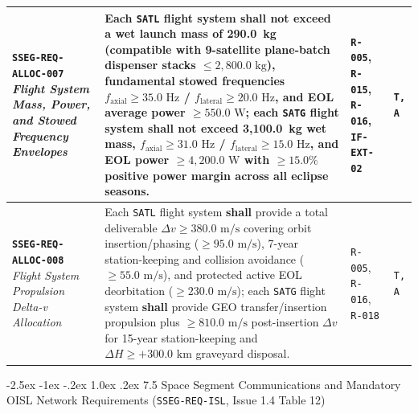 \documentclass[11pt,a4paper]{article}
\makeatletter
\renewcommand\subsection{\@startsection{subsection}{2}{\z@}%
    {-2.5ex \@plus -1ex \@minus -.2ex}%
    {1.0ex \@plus .2ex}%
    {\normalfont\large\bfseries\sffamily\color{SubHeadingBlue}}}
\providecommand{\abbr}[1]{#1}
\makeatother
\begin{document}
{\begin{longtable}{|>{\raggedright\arraybackslash}p{}|>{\raggedright\arraybackslash}p{}|>{\raggedright\arraybackslash}p{}|>{\raggedright\arraybackslash}p{}|}
\textbf{\texttt{SSEG-REQ-ALLOC-007}} \newline \emph{Flight System Mass, Power, and Stowed Frequency Envelopes} & Each \texttt{SATL} flight system \textbf{shall} not exceed a wet launch mass of 290.0~kg (compatible with 9-satellite plane-batch dispenser stacks $\le 2{,}800.0\text{ kg}$), fundamental stowed frequencies $f_{\text{axial}} \ge 35.0\text{ Hz}$ / $f_{\text{lateral}} \ge 20.0\text{ Hz}$, and \abbr{EOL} average power $\ge 550.0\text{ W}$; each \texttt{SATG} flight system \textbf{shall} not exceed 3,100.0~kg wet mass, $f_{\text{axial}} \ge 31.0\text{ Hz}$ / $f_{\text{lateral}} \ge 15.0\text{ Hz}$, and \abbr{EOL} power $\ge 4{,}200.0\text{ W}$ with $\ge 15.0\%$ positive power margin across all eclipse seasons. & \texttt{R-005}, \texttt{R-015}, \texttt{R-016}, \texttt{IF-EXT-02} & \texttt{T, A} \\ \hline
\textbf{\texttt{SSEG-REQ-ALLOC-008}} \newline \emph{Flight System Propulsion Delta-v Allocation} & Each \texttt{SATL} flight system \textbf{shall} provide a total deliverable $\Delta v \ge 380.0\text{ m/s}$ covering orbit insertion/phasing ($\ge 95.0\text{ m/s}$), 7-year station-keeping and collision avoidance ($\ge 55.0\text{ m/s}$), and protected active \abbr{EOL} deorbitation ($\ge 230.0\text{ m/s}$); each \texttt{SATG} flight system \textbf{shall} provide \abbr{GEO} transfer/insertion propulsion plus $\ge 810.0\text{ m/s}$ post-insertion $\Delta v$ for 15-year station-keeping and $\Delta H \ge +300.0\text{ km}$ graveyard disposal. & \texttt{R-005}, \texttt{R-016}, \texttt{R-018} & \texttt{T, A} \\ \hline
\end{longtable}}

\subsection{7.5 Space Segment Communications and Mandatory OISL Network Requirements (\texttt{SSEG-REQ-ISL}, Issue 1.4 Table 12)}
\end{document}
